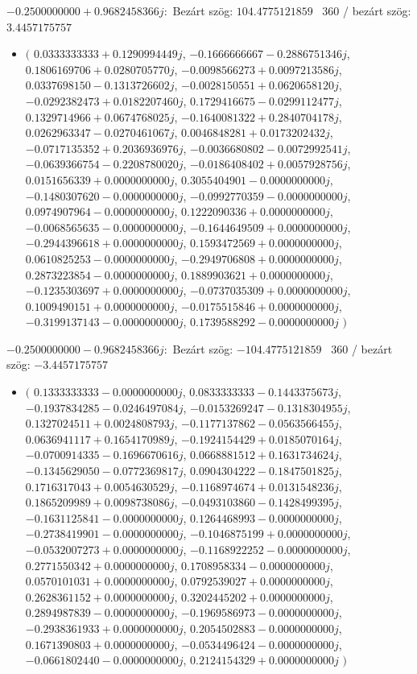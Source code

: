 \documentclass[14pt,a4paper]{article}
\begin{document}
$-0.2500000000+0.9682458366j$:\
Bezárt szög: $104.4775121859$ \
360 / bezárt szög: $3.4457175757$\
\begin{itemize}
\item
$\big($
$0.0333333333+0.1290994449j$, $-0.1666666667-0.2886751346j$, $0.1806169706+0.0280705770j$, $-0.0098566273+0.0097213586j$, $0.0337698150-0.1313726602j$, $-0.0028150551+0.0620658120j$, $-0.0292382473+0.0182207460j$, $0.1729416675-0.0299112477j$, $0.1329714966+0.0674768025j$, $-0.1640081322+0.2840704178j$, $0.0262963347-0.0270461067j$, $0.0046848281+0.0173202432j$, $-0.0717135352+0.2036936976j$, $-0.0036680802-0.0072992541j$, $-0.0639366754-0.2208780020j$, $-0.0186408402+0.0057928756j$, $0.0151656339+0.0000000000j$, $0.3055404901-0.0000000000j$, $-0.1480307620-0.0000000000j$, $-0.0992770359-0.0000000000j$, $0.0974907964-0.0000000000j$, $0.1222090336+0.0000000000j$, $-0.0068565635-0.0000000000j$, $-0.1644649509+0.0000000000j$, $-0.2944396618+0.0000000000j$, $0.1593472569+0.0000000000j$, $0.0610825253-0.0000000000j$, $-0.2949706808+0.0000000000j$, $0.2873223854-0.0000000000j$, $0.1889903621+0.0000000000j$, $-0.1235303697+0.0000000000j$, $-0.0737035309+0.0000000000j$, $0.1009490151+0.0000000000j$, $-0.0175515846+0.0000000000j$, $-0.3199137143-0.0000000000j$, $0.1739588292-0.0000000000j$
$\big)$
\end{itemize}
$-0.2500000000-0.9682458366j$:\
Bezárt szög: $-104.4775121859$ \
360 / bezárt szög: $-3.4457175757$\
\begin{itemize}
\item
$\big($
$0.1333333333-0.0000000000j$, $0.0833333333-0.1443375673j$, $-0.1937834285-0.0246497084j$, $-0.0153269247-0.1318304955j$, $0.1327024511+0.0024808793j$, $-0.1177137862-0.0563566455j$, $0.0636941117+0.1654170989j$, $-0.1924154429+0.0185070164j$, $-0.0700914335-0.1696670616j$, $0.0668881512+0.1631734624j$, $-0.1345629050-0.0772369817j$, $0.0904304222-0.1847501825j$, $0.1716317043+0.0054630529j$, $-0.1168974674+0.0131548236j$, $0.1865209989+0.0098738086j$, $-0.0493103860-0.1428499395j$, $-0.1631125841-0.0000000000j$, $0.1264468993-0.0000000000j$, $-0.2738419901-0.0000000000j$, $-0.1046875199+0.0000000000j$, $-0.0532007273+0.0000000000j$, $-0.1168922252-0.0000000000j$, $0.2771550342+0.0000000000j$, $0.1708958334-0.0000000000j$, $0.0570101031+0.0000000000j$, $0.0792539027+0.0000000000j$, $0.2628361152+0.0000000000j$, $0.3202445202+0.0000000000j$, $0.2894987839-0.0000000000j$, $-0.1969586973-0.0000000000j$, $-0.2938361933+0.0000000000j$, $0.2054502883-0.0000000000j$, $0.1671390803+0.0000000000j$, $-0.0534496424-0.0000000000j$, $-0.0661802440-0.0000000000j$, $0.2124154329+0.0000000000j$
$\big)$
\end{itemize}
\end{document}
